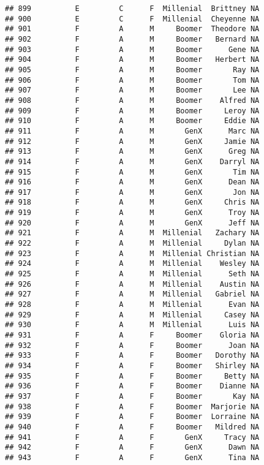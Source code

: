 \documentclass[
]{article}
\begin{document}
\begin{verbatim}
## 899          E         C      F  Millenial  Brittney NA
## 900          E         C      F  Millenial  Cheyenne NA
## 901          F         A      M     Boomer  Theodore NA
## 902          F         A      M     Boomer   Bernard NA
## 903          F         A      M     Boomer      Gene NA
## 904          F         A      M     Boomer   Herbert NA
## 905          F         A      M     Boomer       Ray NA
## 906          F         A      M     Boomer       Tom NA
## 907          F         A      M     Boomer       Lee NA
## 908          F         A      M     Boomer    Alfred NA
## 909          F         A      M     Boomer     Leroy NA
## 910          F         A      M     Boomer     Eddie NA
## 911          F         A      M       GenX      Marc NA
## 912          F         A      M       GenX     Jamie NA
## 913          F         A      M       GenX      Greg NA
## 914          F         A      M       GenX    Darryl NA
## 915          F         A      M       GenX       Tim NA
## 916          F         A      M       GenX      Dean NA
## 917          F         A      M       GenX       Jon NA
## 918          F         A      M       GenX     Chris NA
## 919          F         A      M       GenX      Troy NA
## 920          F         A      M       GenX      Jeff NA
## 921          F         A      M  Millenial   Zachary NA
## 922          F         A      M  Millenial     Dylan NA
## 923          F         A      M  Millenial Christian NA
## 924          F         A      M  Millenial    Wesley NA
## 925          F         A      M  Millenial      Seth NA
## 926          F         A      M  Millenial    Austin NA
## 927          F         A      M  Millenial   Gabriel NA
## 928          F         A      M  Millenial      Evan NA
## 929          F         A      M  Millenial     Casey NA
## 930          F         A      M  Millenial      Luis NA
## 931          F         A      F     Boomer    Gloria NA
## 932          F         A      F     Boomer      Joan NA
## 933          F         A      F     Boomer   Dorothy NA
## 934          F         A      F     Boomer   Shirley NA
## 935          F         A      F     Boomer     Betty NA
## 936          F         A      F     Boomer    Dianne NA
## 937          F         A      F     Boomer       Kay NA
## 938          F         A      F     Boomer  Marjorie NA
## 939          F         A      F     Boomer  Lorraine NA
## 940          F         A      F     Boomer   Mildred NA
## 941          F         A      F       GenX     Tracy NA
## 942          F         A      F       GenX      Dawn NA
## 943          F         A      F       GenX      Tina NA

\end{verbatim}
\end{document}
